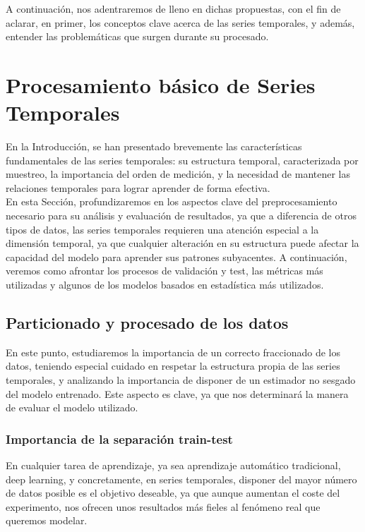 A continuación, nos adentraremos de lleno en dichas propuestas, con el fin de aclarar, en primer, los conceptos clave acerca de las series temporales, y además, entender las problemáticas que surgen durante su procesado.


\section{Procesamiento básico de Series Temporales}

En la Introducción, se han presentado brevemente las características fundamentales de las series temporales: su estructura temporal, caracterizada por muestreo, la importancia del orden de medición, y la necesidad de mantener las relaciones temporales para lograr aprender de forma efectiva.\\

En esta Sección, profundizaremos en los aspectos clave del preprocesamiento necesario para su análisis y evaluación de resultados, ya que a diferencia de otros tipos de datos, las series temporales requieren una atención especial a la dimensión temporal, ya que cualquier alteración en su estructura puede afectar la capacidad del modelo para aprender sus patrones subyacentes. A continuación, veremos como afrontar los procesos de validación y test, las métricas más utilizadas y algunos de los modelos basados en estadística más utilizados.

\subsection{Particionado y procesado de los datos}
\label{particiones}

En este punto, estudiaremos la importancia de un correcto fraccionado de los datos, teniendo especial cuidado en respetar la estructura propia de las series temporales, y analizando la importancia de disponer de un estimador no sesgado del modelo entrenado. Este aspecto es clave, ya que nos determinará la manera de evaluar el modelo utilizado.

\subsubsection{Importancia de la separación train-test}

En cualquier tarea de aprendizaje, ya sea aprendizaje automático tradicional, deep learning, y concretamente, en series temporales, disponer del mayor número de datos posible es el objetivo deseable, ya que aunque aumentan el coste del experimento, nos ofrecen unos resultados más fieles al fenómeno real que queremos modelar.\\

